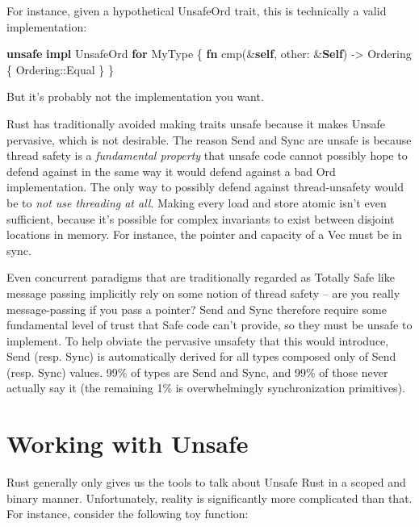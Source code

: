 \documentclass[a4paper,]{book}
\newenvironment{Shaded}{\begin{snugshade}}{\end{snugshade}}
\newcommand{\KeywordTok}[1]{\textcolor[rgb]{0.13,0.29,0.53}{\textbf{{#1}}}}
\newcommand{\NormalTok}[1]{{#1}}
\begin{document}
For instance, given a hypothetical UnsafeOrd trait, this is technically
a valid implementation:

\begin{Shaded}
\begin{Highlighting}[]
\KeywordTok{unsafe} \KeywordTok{impl} \NormalTok{UnsafeOrd }\KeywordTok{for} \NormalTok{MyType \{}
    \KeywordTok{fn} \NormalTok{cmp(&}\KeywordTok{self}\NormalTok{, other: &}\KeywordTok{Self}\NormalTok{) -> Ordering \{}
        \NormalTok{Ordering::Equal}
    \NormalTok{\}}
\NormalTok{\}}
\end{Highlighting}
\end{Shaded}

But it's probably not the implementation you want.

Rust has traditionally avoided making traits unsafe because it makes
Unsafe pervasive, which is not desirable. The reason Send and Sync are
unsafe is because thread safety is a \emph{fundamental property} that
unsafe code cannot possibly hope to defend against in the same way it
would defend against a bad Ord implementation. The only way to possibly
defend against thread-unsafety would be to \emph{not use threading at
all}. Making every load and store atomic isn't even sufficient, because
it's possible for complex invariants to exist between disjoint locations
in memory. For instance, the pointer and capacity of a Vec must be in
sync.

Even concurrent paradigms that are traditionally regarded as Totally
Safe like message passing implicitly rely on some notion of thread
safety -- are you really message-passing if you pass a pointer? Send and
Sync therefore require some fundamental level of trust that Safe code
can't provide, so they must be unsafe to implement. To help obviate the
pervasive unsafety that this would introduce, Send (resp. Sync) is
automatically derived for all types composed only of Send (resp. Sync)
values. 99\% of types are Send and Sync, and 99\% of those never
actually say it (the remaining 1\% is overwhelmingly synchronization
primitives).

\section{Working with Unsafe}\label{sec--working-with-unsafe}

Rust generally only gives us the tools to talk about Unsafe Rust in a
scoped and binary manner. Unfortunately, reality is significantly more
complicated than that. For instance, consider the following toy
function:
\end{document}
